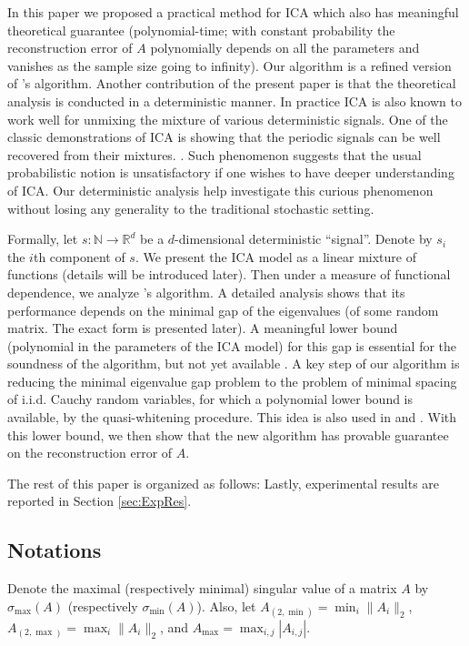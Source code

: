 \documentclass[twoside]{article}
\newcommand{\ra}{\rightarrow}
\newcommand{\real}{\mathbb{R}}
\renewcommand{\natural}{\mathbb{N}}
\theoremstyle{definition}
\begin{document}
In this paper we proposed a practical method for ICA which also has meaningful theoretical guarantee (polynomial-time; with constant probability the reconstruction error of $A$ polynomially depends on all the parameters and vanishes as the sample size going to infinity).
Our algorithm is a refined version of \cite{hsu2013learning}'s algorithm.  
Another contribution of the present paper is that the theoretical analysis is conducted in a deterministic manner. 
In practice ICA is also known to work well for unmixing the mixture of various deterministic signals. 
One of the classic demonstrations of ICA is showing that the periodic signals can be well recovered from their mixtures. \citep{HyvOja00}.
Such phenomenon suggests that the usual probabilistic notion is unsatisfactory if one wishes to have deeper understanding of ICA.   
Our deterministic analysis help investigate this curious phenomenon without losing any generality to the traditional stochastic setting. 

Formally, let $s:\natural \ra \real^d$ be a $d$-dimensional deterministic ``signal''. 
Denote by $s_i$ the $i$th component of $s$.
We present the ICA model as a linear mixture of functions (details will be introduced later).
Then under a measure of functional dependence, we analyze  \citep{hsu2013learning}'s algorithm.
A detailed analysis shows that its performance depends on the minimal gap of the eigenvalues (of some random matrix. The exact form is presented later).
A meaningful lower bound  (polynomial in the parameters of the ICA model) for this gap is essential for the soundness of the algorithm, but not yet available \citep{cardoso1999high}.
A key step of our algorithm is reducing the minimal eigenvalue gap problem to the problem of minimal spacing of i.i.d. Cauchy random variables, for which a polynomial lower bound is available, by the quasi-whitening procedure.
This idea is also used in \citep{frieze1996learning} and \citep{arora2012provable}.
With this lower bound, we then show that the new algorithm has provable guarantee on the reconstruction error of $A$. 

The rest of this paper is organized as follows: 
Lastly, experimental results are reported in Section \ref{sec:ExpRes}.

\subsection{Notations}
Denote the maximal (respectively minimal) singular value of a matrix $A$ by  $\sigma_{\max}(A)$ (respectively $\sigma_{\min}(A)$). Also, let $A_{(2,\min)} = \min_{i} \|A_i\|_2$, $A_{(2,\max)} = \max_{i} \|A_i\|_2$, and $A_{\max} = \max_{i,j} |A_{i,j}|$.
\end{document}
